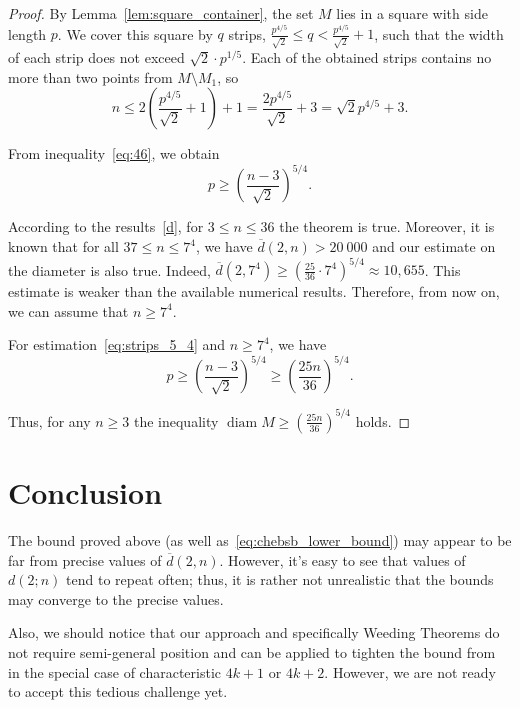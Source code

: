 \documentclass[a4paper,14pt]{article} %
\theoremstyle{plain}
\theoremstyle{definition}
\begin{document}
\begin{proof}
	By Lemma~\ref{lem:square_container}, the set $M$ lies in a square with side length $p$. We cover this square by $q$ strips, $\frac{p^{4/5}}{\sqrt{2}} \leq q < \frac{p^{4/5}}{\sqrt{2}} + 1$, such that the width of each strip does not exceed $\sqrt{2} \cdot p^{1/5}$.
	Each of the obtained strips contains no more than two points from $M \setminus {M_1}$, so
	\begin{equation}
		\label{eq: 46}
		n \leq 2 \left( \frac{p^{4/5}}{\sqrt{2}} + 1\right) + 1=\frac{2p^{4/5}}{\sqrt{2}} +3 = \sqrt{2}p^{4/5}+3
		.
	\end{equation}

	From inequality~\eqref{eq:46}, we obtain
	\begin{equation}
		\label{eq:strips_5_4}
		p \geq \left( \frac{n -3}{\sqrt{2}} \right)^{5/4}
		.
	\end{equation}

	According to the results~\eqref{d}, for $3 \leq n \leq 36$ the theorem is true.
	Moreover, it is known that for all $37 \leq n \leq 7^4$, we have $\overline{d}(2, n) > 20\ 000$  and our estimate on the diameter is also true.
	Indeed, $\overline{d}(2, 7^4) \geq \left(\frac{25}{36}\cdot 7^4\right)^{5/4} \approx 10,655$.
	This estimate is weaker than the available numerical results. Therefore, from now on, we can assume that $n \geq 7^4$.

	For estimation~\eqref{eq:strips_5_4} and $n \geq 7^4$, we have
	\begin{equation}
		\label{eq:strips_5_4_7}
		p \geq \left( \frac{n -3}{\sqrt{2}} \right)^{5/4}  \geq \left( \frac{25n}{36} \right)^{5/4}
		.
	\end{equation}

	Thus, for any $n \geq 3$ the inequality $
		\operatorname{diam} M \geq \left( \frac{25n}{36} \right)^{5/4}
	$ holds.
\end{proof}



\section{Conclusion}
	The bound proved above (as well as~\eqref{eq:chebsb_lower_bound}) may appear to be far from precise values of $\overline{d}(2,n)$.
	However, it's easy to see that values of $d(2;n)$ tend to repeat often;
	thus, it is rather not unrealistic that the bounds may converge to the precise values.

	Also, we should notice that our approach and  specifically Weeding Theorems do not require semi-general position and can be applied to tighten the bound from~\cite{my-pps-linear-bound-2019}
	in the special case of characteristic $4k+1$ or $4k+2$.
	However, we are not ready to accept this tedious challenge yet.
\end{document}

